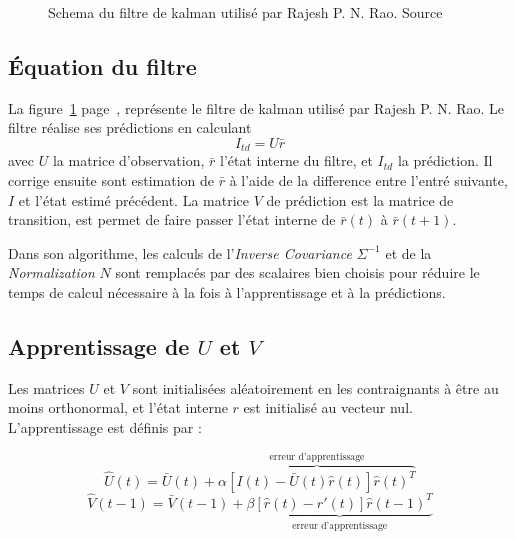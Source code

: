 \begin{figure}[ht]
   \begin{center}
   \end{center}
   \caption[Schema du filtre de kalman]{Schema du filtre de kalman utilisé par
   Rajesh P. N. Rao. Source \cite{Rao1999}}
   \label{fig:filtre_kalman}
\end{figure}

\subsection{Équation du filtre} %
\label{sub:Équation du filtre}

La figure~\ref{fig:filtre_kalman} page~\pageref{fig:filtre_kalman}, représente
le filtre de kalman utilisé par Rajesh P. N. Rao. Le filtre réalise ses
prédictions en calculant
\[ I_{td} = U\bar{r} \]
avec $U$ la matrice d'observation, $\bar{r}$ l'état interne du filtre, et
$I_{td}$ la prédiction. Il corrige ensuite sont estimation de $\bar{r}$ à
l'aide de la difference entre l'entré suivante, $I$ et l'état estimé précédent. La
matrice $V$ de prédiction est la matrice de transition, est permet de faire
passer l'état interne de $\bar{r}(t)$ à $\bar{r}(t+1)$.

Dans son algorithme, les calculs de l'\textit{Inverse Covariance} $\Sigma^{-1}$ et
de la \textit{Normalization} $N$ sont remplacés par des scalaires bien choisis
pour réduire le temps de calcul nécessaire à la fois à l'apprentissage et à la
prédictions.


\subsection{Apprentissage de $U$ et $V$} %
\label{sub:Apprentissage de U et V}

Les matrices $U$ et $V$ sont initialisées aléatoirement en les contraignants
à être au moins orthonormal, et l'état interne $r$ est initialisé au vecteur
nul. L'apprentissage est définis par :

\begin{equation}
   \label{eqn:learning_U}
   \hat{U}(t) = \bar{U}(t) + \overbrace{\alpha[I(t) - \bar{U}(t)\hat{r}(t)]\hat{r}(t)^T}^\text{erreur d'apprentissage}
\end{equation}
\begin{equation}
   \label{eqn:learning_V}
   \hat{V}(t-1) = \bar{V}(t-1) + \underbrace{\beta[\hat{r}(t) - r'(t)]\hat{r}(t-1)^T}_\text{erreur d'apprentissage}
\end{equation}

